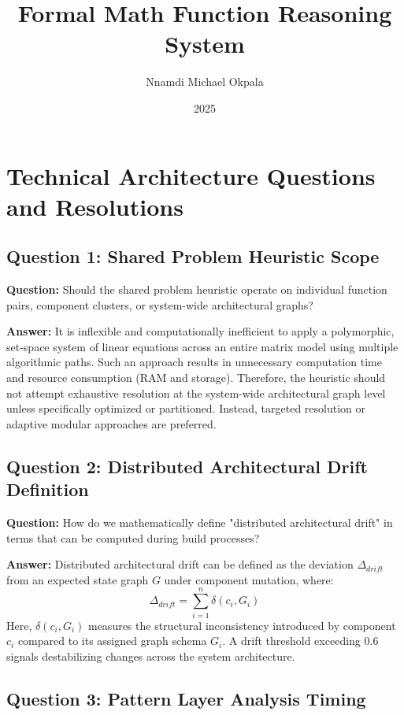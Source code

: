 \documentclass{article}
\title{Formal Math Function Reasoning System}
\author{Nnamdi Michael Okpala}
\date{2025}
\begin{document}
\maketitle

\section{Technical Architecture Questions and Resolutions}

\subsection{Question 1: Shared Problem Heuristic Scope}

\textbf{Question:} Should the shared problem heuristic operate on individual function pairs, component clusters, or system-wide architectural graphs?

\textbf{Answer:} It is inflexible and computationally inefficient to apply a polymorphic, set-space system of linear equations across an entire matrix model using multiple algorithmic paths. Such an approach results in unnecessary computation time and resource consumption (RAM and storage). Therefore, the heuristic should not attempt exhaustive resolution at the system-wide architectural graph level unless specifically optimized or partitioned. Instead, targeted resolution or adaptive modular approaches are preferred.

\subsection{Question 2: Distributed Architectural Drift Definition}

\textbf{Question:} How do we mathematically define "distributed architectural drift" in terms that can be computed during build processes?

\textbf{Answer:} Distributed architectural drift can be defined as the deviation $\Delta_{drift}$ from an expected state graph $G$ under component mutation, where:
\[ \Delta_{drift} = \sum_{i=1}^{n} \delta(c_i, G_i) \]
Here, $\delta(c_i, G_i)$ measures the structural inconsistency introduced by component $c_i$ compared to its assigned graph schema $G_i$. A drift threshold exceeding $0.6$ signals destabilizing changes across the system architecture.

\subsection{Question 3: Pattern Layer Analysis Timing}
\end{document}
